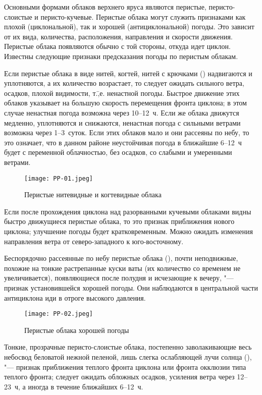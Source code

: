 Основными формами облаков верхнего яруса являются перистые,
перисто-слоистые и перисто-кучевые. Перистые облака могут служить
признаками как плохой (циклональной), так и хорошей (антициклональной)
погоды. Это зависит от их вида, количества, расположения, направления
и скорости движения. Перистые облака появляются обычно с той стороны,
откуда идет циклон. Известны следующие признаки предсказания погоды по
перистым облакам.

 Если перистые облака в виде нитей, когтей, нитей с крючками
() надвигаются и уплотняются, а их количество возрастает,
то следует ожидать сильного ветра, осадков, плохой видимости,
т.\=,е. ненастной погоды. Быстрое движение этих облаков указывает на
большую скорость перемещения фронта циклона; в этом случае ненастная
погода возможна через 10--12~ч. Если же облака движутся медленно,
уплотняются и снижаются, ненастная погода с сильными ветрами возможна
через 1--3~суток. Если этих облаков мало и они рассеяны по небу,
то это означает, что в данном районе неустойчивая погода в ближайшие
6--12~ч будет с переменной облачностью, без осадков, со слабыми и
умеренными ветрами.

\begin{figure}[htb]
  \centering{}
  \texttt{[image: PP-01.jpeg]}
  \caption{Перистые нитевидные и когтевидные облака}
  \label{fig:pp01}
  \small
  \centering{}
\end{figure}

 Если после прохождения циклона над разорванными кучевыми
облаками видны быстро движущиеся перистые облака, то это признак
приближения нового циклона; улучшение погоды будет
кратковременным. Можно ожидать изменения направления ветра от
северо-западного к юго-восточному.

 Беспорядочно рассеянные по небу перистые облака (),
почти неподвижные, похожие на тонкие растрепанные куски ваты (их
количество со временем не увеличивается), появляющиеся после полудня и
исчезающие к вечеру, "--- признак установившейся хорошей погоды. Они
наблюдаются в центральной части антициклона иди в отроге высокого
давления.

\begin{figure}[htb]
  \centering{}
  \texttt{[image: PP-02.jpeg]}
  \caption{Перистые облака хорошей погоды}
  \label{fig:pp02}
  \small
  \centering{}
\end{figure}

 Тонкие, прозрачные перисто-слоистые облака, постепенно
заволакивающие весь небосвод беловатой нежной пеленой, лишь слегка
ослабляющей лучи солнца (), "--- признак приближения теплого
фронта циклона или фронта окклюзии типа теплого фронта; следует
ожидать обложных осадков, усиления ветра через 12--23~ч, а иногда
в течение ближайших 6--12~ч.


